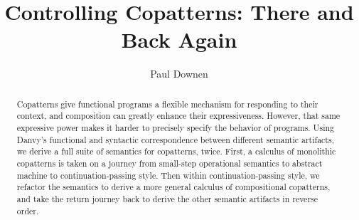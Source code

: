 \documentclass[sigplan,screen]{acmart}
\begin{document}
\title{Controlling Copatterns: There and Back Again}

\author{Paul Downen}

\renewcommand{\shortauthors}{Downen}

\begin{abstract}
  Copatterns give functional programs a flexible mechanism for responding to
  their context, and composition can greatly enhance their expressiveness.
  However, that same expressive power makes it harder to precisely specify the
  behavior of programs.  Using Danvy's functional and syntactic correspondence
  between different semantic artifacts, we derive a full suite of semantics for
  copatterns, twice.  First, a calculus of monolithic copatterns is taken on a
  journey from small-step operational semantics to abstract machine to
  continuation-passing style.  Then within continuation-passing style, we
  refactor the semantics to derive a more general calculus of compositional
  copatterns, and take the return journey back to derive the other semantic
  artifacts in reverse order.
\end{abstract}
\end{document}
